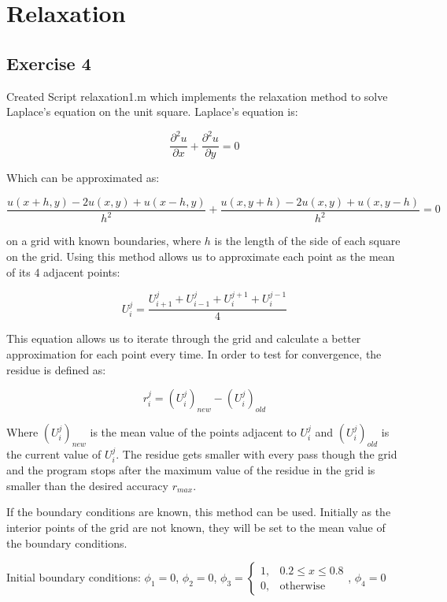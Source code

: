 \documentclass[11pt, oneside, titlepage]{article}   	%
\begin{document}
\section{Relaxation}
\subsection{Exercise 4}

Created Script relaxation1.m which implements the relaxation method to solve Laplace's equation on the unit square. Laplace's equation is:

\begin{equation}
\frac{\partial^2u}{\partial x} + \frac{\partial^2u}{\partial y} = 0
\end{equation}

Which can be approximated as:

\begin{equation}
\frac{u(x+h, y) - 2u(x, y) + u(x-h, y)}{h^2} + \frac{u(x, y+h) -2u(x, y) + u(x, y-h)}{h^2} = 0
\end{equation}

on a grid with known boundaries, where $h$ is the length of the side of each square on the grid. Using this method allows us to approximate each point as the mean of its 4 adjacent points:

\begin{equation}
U_i^j = \frac{U_{i+1}^j + U_{i-1}^j + U_i^{j+1} + U_i^{j-1}}{4}
\end{equation}

This equation allows us to iterate through the grid and calculate a better approximation for each point every time. In order to test for convergence, the residue is defined as:

\begin{equation}
r^j_i = (U_i^j)_{new} - (U_i^j)_{old}
\end{equation}

Where $(U_i^j)_{new}$ is the mean value of the points adjacent to $U_i^j$ and $(U_i^j)_{old}$ is the current value of $U_i^j$. The residue gets smaller with every pass though the grid and the program stops after the maximum value of the residue in the grid is smaller than the desired accuracy $r_{max}$.

If the boundary conditions are known, this method can be used. Initially as the interior points of the grid are not known, they will be set to the mean value of the boundary conditions.


Initial boundary conditions:
$\phi_1 = 0$, 
$\phi_2 = 0$, 
$\phi_3 = 
\begin{cases}	1, & 0.2 \leq x \leq 0.8 \\
			0, & \text{otherwise}  \end{cases}$, 
$\phi_4 = 0$ 
 
\end{document}
